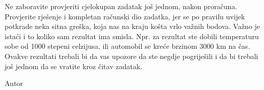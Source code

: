 	Ne zaboravite provjeriti cjelokupan zadatak još jednom, nakon proračuna. Provjerite rješenje i kompletan računski dio zadatka, jer se po pravilu uvijek potkrade neka sitna greška, koja nas  na kraju košta vrlo važnih bodova.
	Važno je istaći i to koliko sam rezultat ima smisla. Npr.  za rezultat ste dobili temperaturu sobe od 1000 stepeni celzijusa, ili automobil se kreće brzinom 3000 km na čas. Ovakve rezultati trebali bi da vas upozore da ste negdje pogriješili i da bi trebali još jednom da se vratite  kroz čitav zadatak.
	
	\begin{flushright}
		Autor
	\end{flushright}
	\newpage
	\patchcmd{\chapter}
	{\clearpage}
	{\cleardoublepage}
	{}
	{}
		\pagestyle{headings}